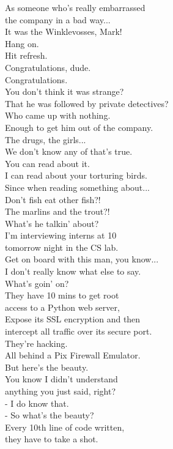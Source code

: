 \documentclass{article}
\begin{document}
\begin{multicols}{3}
As someone who's really embarrassed\\
the company in a bad way...\\
It was the Winklevosses, Mark!\\
Hang on.\\
Hit refresh.\\
Congratulations, dude.\\
Congratulations.\\
You don't think it was strange?\\
That he was followed by private detectives?\\
Who came up with nothing.\\
Enough to get him out of the company.\\
The drugs, the girls...\\
We don't know any of that's true.\\
You can read about it.\\
I can read about your torturing birds.\\
Since when reading something about...\\
Don't fish eat other fish?!\\
The marlins and the trout?!\\
What's he talkin' about?\\
I'm interviewing interns at 10\\
tomorrow night in the CS lab.\\
Get on board with this man, you know...\\
I don't really know what else to say.\\
What's goin' on?\\
They have 10 mins to get root\\
access to a Python web server,\\
Expose its SSL encryption and then\\
intercept all traffic over its secure port.\\
They're hacking.\\
All behind a Pix Firewall Emulator.\\
But here's the beauty.\\
You know I didn't understand\\
anything you just said, right?\\
- I do know that.\\
- So what's the beauty?\\
Every 10th line of code written,\\
they have to take a shot.\\

\end{multicols}
\end{document}
